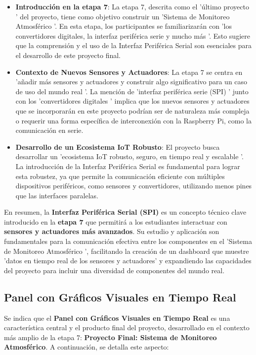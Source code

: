 \documentclass{report}
\begin{document}
\begin{itemize}
    \item \textbf{Introducción en la etapa 7}: La etapa 7, descrita como el  'último proyecto ' del proyecto, tiene como objetivo construir un 
     'Sistema de Monitoreo Atmosférico '. En esta etapa, los participantes se familiarizarán con  'los convertidores digitales, la interfaz periférica serie 
    y mucho más '. Esto sugiere que la comprensión y el uso de la Interfaz Periférica Serial son esenciales para el desarrollo de este proyecto final.
    \item \textbf{Contexto de Nuevos Sensores y Actuadores}: La etapa 7 se centra en  'añadir más sensores y actuadores y construir algo significativo para un 
    caso de uso del mundo real '. La mención de  'interfaz periférica serie (SPI) ' junto con los  'convertidores digitales ' implica que los nuevos sensores y 
    actuadores que se incorporarán en este proyecto podrían ser de naturaleza más compleja o requerir una forma específica de interconexión con la Raspberry Pi, 
    como la comunicación en serie.
    \item \textbf{Desarrollo de un Ecosistema IoT Robusto}: El proyecto busca desarrollar un  'ecosistema IoT robusto, seguro, en tiempo real y escalable '. 
    La introducción de la Interfaz Periférica Serial es fundamental para lograr esta robustez, ya que permite la comunicación eficiente con múltiples 
    dispositivos periféricos, como sensores y convertidores, utilizando menos pines que las interfaces paralelas.
\end{itemize}
En resumen, la \textbf{Interfaz Periférica Serial (SPI)} es un concepto técnico clave introducido en la \textbf{etapa 7} que permitirá a los estudiantes 
interactuar con \textbf{sensores y actuadores más avanzados}. Su estudio y aplicación son fundamentales para la comunicación efectiva entre los componentes 
en el  'Sistema de Monitoreo Atmosférico ', facilitando la creación de un dashboard que muestre  'datos en tiempo real de los sensores y actuadores' y 
expandiendo las capacidades del proyecto para incluir una diversidad de componentes del mundo real.

\subsection{Panel con Gráficos Visuales en Tiempo Real}
Se indica que el \textbf{Panel con Gráficos Visuales en Tiempo Real} es una característica central y el producto final del proyecto, desarrollado 
en el contexto más amplio de la etapa 7: \textbf{Proyecto Final: Sistema de Monitoreo Atmosférico}.
A continuación, se detalla este aspecto:
\end{document}
